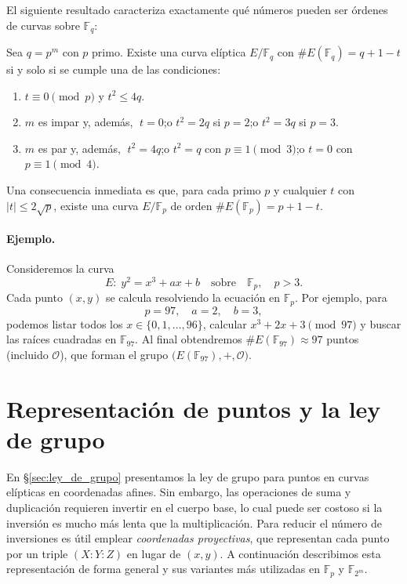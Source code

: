 El siguiente resultado caracteriza exactamente qué números pueden ser órdenes de curvas sobre \(\mathbb{F}_q\):

\begin{teorema}
Sea \(q=p^m\) con \(p\) primo. Existe una curva elíptica \(E/\mathbb{F}_q\) con
\(\#E(\mathbb{F}_q)=q+1-t\) si y solo si se cumple una de las condiciones:
\begin{enumerate}
  \item \(t\equiv0\pmod p\) y \(t^2\le4q\).
  \item \(m\) es impar y, además,  
    \(\;t=0\);\quad o \quad \(t^2=2q\) si \(p=2\);\quad o \quad \(t^2=3q\) si \(p=3\).
  \item \(m\) es par y, además,  
    \(\;t^2=4q\);\quad o \quad \(t^2=q\) con \(p\equiv1\pmod3\);\quad o \quad \(t=0\) con \(p\equiv1\pmod4\).
\end{enumerate}
\end{teorema}

Una consecuencia inmediata es que, para cada primo \(p\) y cualquier \(t\) con \(|t|\le2\sqrt p\), existe una curva \(E/\mathbb{F}_p\) de orden \(\#E(\mathbb{F}_p)=p+1-t\).

\paragraph{Ejemplo.}
Consideremos la curva
\[
  E\colon\;y^2 = x^3 + a x + b
  \quad\text{sobre}\quad
  \mathbb{F}_{p},\quad p>3.
\]
Cada punto \((x,y)\) se calcula resolviendo la ecuación en \(\mathbb{F}_p\). Por ejemplo, para
\[
  p = 97,\quad a=2,\quad b=3,
\]
podemos listar todos los \(x\in\{0,1,\dots,96\}\), calcular \(x^3+2x+3\pmod{97}\) y buscar las raíces cuadradas en \(\mathbb{F}_{97}\). Al final obtendremos \(\#E(\mathbb{F}_{97})\approx97\) puntos (incluido \(\mathcal{O}\)), que forman el grupo \(\bigl(E(\mathbb{F}_{97}),+,\mathcal{O}\bigr)\).

\section{Representación de puntos y la ley de grupo}\label{sec:representacion_puntos}
En \S\ref{sec:ley_de_grupo} presentamos la ley de grupo para puntos en curvas elípticas en coordenadas afines. Sin embargo, las operaciones de suma y duplicación requieren invertir en el cuerpo base, lo cual puede ser costoso si la inversión es mucho más lenta que la multiplicación. Para reducir el número de inversiones es útil emplear \emph{coordenadas proyectivas}, que representan cada punto por un triple \((X:Y:Z)\) en lugar de \((x,y)\). A continuación describimos esta representación de forma general y sus variantes más utilizadas en \(\mathbb{F}_p\) y \(\mathbb{F}_{2^m}\).

